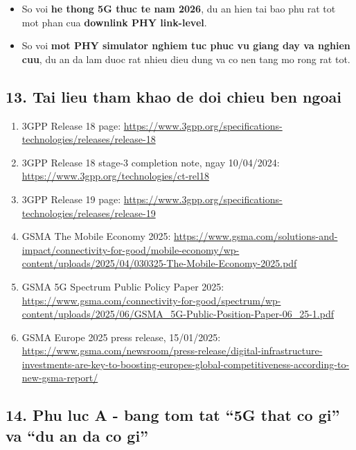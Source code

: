 \documentclass[
  vietnamese,
  a4paper,
  11pt]{article}
\providecommand{\tightlist}{%
  \setlength{\itemsep}{0pt}\setlength{\parskip}{0pt}}
\begin{document}
\begin{itemize}
\tightlist
\item
  So voi \textbf{he thong 5G thuc te nam 2026}, du an hien tai bao phu
  rat tot mot phan cua \textbf{downlink PHY link-level}.
\item
  So voi \textbf{mot PHY simulator nghiem tuc phuc vu giang day va
  nghien cuu}, du an da lam duoc rat nhieu dieu dung va co nen tang mo
  rong rat tot.
\end{itemize}

\subsection{13. Tai lieu tham khao de doi chieu ben
ngoai}\label{tai-lieu-tham-khao-de-doi-chieu-ben-ngoai}

\begin{enumerate}
\def\labelenumi{\arabic{enumi}.}
\tightlist
\item
  3GPP Release 18 page:
  \url{https://www.3gpp.org/specifications-technologies/releases/release-18}
\item
  3GPP Release 18 stage-3 completion note, ngay 10/04/2024:
  \url{https://www.3gpp.org/technologies/ct-rel18}
\item
  3GPP Release 19 page:
  \url{https://www.3gpp.org/specifications-technologies/releases/release-19}
\item
  GSMA The Mobile Economy 2025:
  \url{https://www.gsma.com/solutions-and-impact/connectivity-for-good/mobile-economy/wp-content/uploads/2025/04/030325-The-Mobile-Economy-2025.pdf}
\item
  GSMA 5G Spectrum Public Policy Paper 2025:
  \url{https://www.gsma.com/connectivity-for-good/spectrum/wp-content/uploads/2025/06/GSMA_5G-Public-Position-Paper-06_25-1.pdf}
\item
  GSMA Europe 2025 press release, 15/01/2025:
  \url{https://www.gsma.com/newsroom/press-release/digital-infrastructure-investments-are-key-to-boosting-europes-global-competitiveness-according-to-new-gsma-report/}
\end{enumerate}

\subsection{14. Phu luc A - bang tom tat ``5G that co gi'' va ``du an da
co gi''}\label{phu-luc-a---bang-tom-tat-5g-that-co-gi-va-du-an-da-co-gi}
\end{document}
